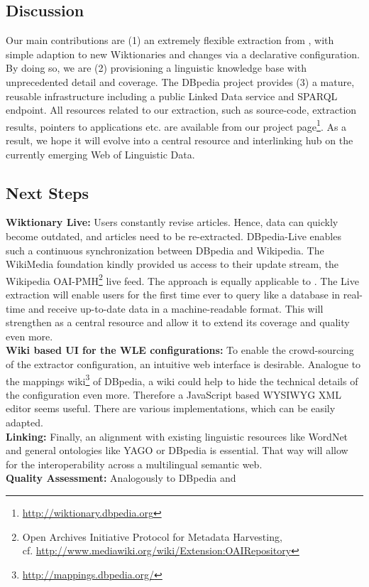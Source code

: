 \subsection{Discussion}
Our main contributions are (1) an extremely flexible extraction from \wik, with simple adaption to new Wiktionaries and changes via a declarative configuration. 
By doing so, we are (2) provisioning a linguistic knowledge base with unprecedented detail and coverage. 
The DBpedia project provides (3) a mature, reusable infrastructure including a public Linked Data service and SPARQL endpoint. All resources related to our \wik extraction, such as source-code, extraction results, pointers to applications etc. are available from our project page\footnote{\url{http://wiktionary.dbpedia.org}}.
As a result, we hope it will evolve into a central resource and interlinking hub on the currently emerging Web of Linguistic Data.

\subsection{Next Steps}
\textbf{Wiktionary Live:}
Users constantly revise articles.
Hence, data can quickly become outdated, and articles need to be re-extracted. DBpedia-Live enables such a continuous synchronization between DBpedia and Wikipedia.
The WikiMedia foundation kindly provided us access to their update stream, the Wikipedia OAI-PMH\footnote{Open Archives Initiative Protocol for Metadata Harvesting,\\
cf. \url{http://www.mediawiki.org/wiki/Extension:OAIRepository}} live feed.
The approach is equally applicable to \wik. 
The \wik Live extraction will enable users for the first time ever to query \wik like a database in real-time and receive up-to-date data in a machine-readable format.
This will strengthen \wik as a central resource and allow it to extend its coverage and quality even more.\\
\textbf{Wiki based UI for the WLE configurations:}
To enable the crowd-sourcing of the extractor configuration, an intuitive web interface is desirable. Analogue to the mappings wiki\footnote{\url{http://mappings.dbpedia.org/}} of DBpedia, a wiki could help to hide the technical details of the configuration even more. 
Therefore a JavaScript based WYSIWYG XML editor seems useful. 
There are various implementations, which can be easily adapted.\\
\textbf{Linking:}
Finally, an alignment with existing linguistic resources like WordNet and general ontologies like YAGO or DBpedia is essential. That way \wik will allow for the interoperability across a multilingual semantic web.\\
\textbf{Quality Assessment:}
Analogously to DBpedia and 


